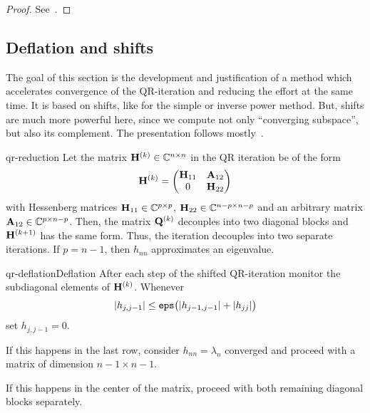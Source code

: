 \begin{proof}
  See~\cite[Theorem 7.3-1]{GolubVanLoan83}.
\end{proof}

\subsection{Deflation and shifts}

\begin{intro}
  The goal of this section is the development and justification of a
  method which accelerates convergence of the QR-iteration and
  reducing the effort at the same time. It is based on shifts, like
  for the simple or inverse power method. But, shifts are much more
  powerful here, since we compute not only ``converging subspace'',
  but also its complement. The presentation follows
  mostly~\cite{GolubVanLoan83}.
\end{intro}

\begin{Theorem}{qr-reduction}
  Let the matrix $\mathbf H^{(k)}\in\mathbb C^{n\times n}$ in the QR iteration be of the
  form
  \begin{gather}
    \mathbf H^{(k)} =
    \begin{pmatrix}
      \mathbf H_{11} & \mathbf A_{12}\\0 & \mathbf H_{22}
    \end{pmatrix}
  \end{gather}
  with Hessenberg matrices $\mathbf H_{11}\in\mathbb C^{p\times p}$,
  $\mathbf H_{22}\in \mathbb C^{n-p\times n-p}$ and an arbitrary matrix
  $\mathbf A_{12}\in \mathbb C^{p\times n-p}$. Then, the matrix $\mathbf Q^{(k)}$
  decouples into two diagonal blocks and $\mathbf H^{(k+1)}$ has the same
  form. Thus, the iteration decouples into two separate iterations. If
  $p=n-1$, then $h_{nn}$ approximates an eigenvalue.
\end{Theorem}

\begin{Algorithm*}{qr-deflation}{Deflation}
  After each step of the shifted QR-iteration monitor the subdiagonal
  elements of $\mathbf H^{(k)}$. Whenever
  \begin{gather}
    \lvert h_{j,j-1}\rvert \le \texttt{eps} \bigl(\lvert h_{j-1,j-1}\rvert+\lvert h_{jj}\rvert\bigr)
  \end{gather}
  set $h_{j,j-1}=0$.

  If this happens in the last row, consider $h_{nn}=\lambda_n$
  converged and proceed with a matrix of dimension $n-1\times n-1$.

  If this happens in the center of the matrix, proceed with both
  remaining diagonal blocks separately.
\end{Algorithm*}

